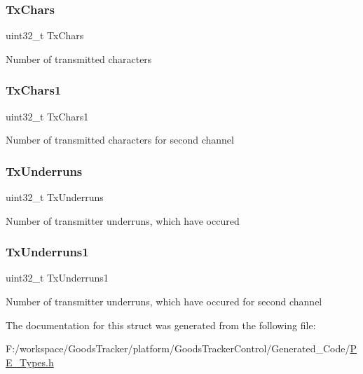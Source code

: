 \subsubsection{\texorpdfstring{Tx\+Chars}{TxChars}}
{\footnotesize\ttfamily uint32\+\_\+t Tx\+Chars}

Number of transmitted characters \mbox{\label{struct_l_d_d___s_s_i___t_stats_aaf7923b544b9bd5dfaeda106f17d0252}} 
\subsubsection{\texorpdfstring{Tx\+Chars1}{TxChars1}}
{\footnotesize\ttfamily uint32\+\_\+t Tx\+Chars1}

Number of transmitted characters for second channel \mbox{\label{struct_l_d_d___s_s_i___t_stats_a9bb1db011f85a3c7644080f7cc482925}} 
\subsubsection{\texorpdfstring{Tx\+Underruns}{TxUnderruns}}
{\footnotesize\ttfamily uint32\+\_\+t Tx\+Underruns}

Number of transmitter underruns, which have occured \mbox{\label{struct_l_d_d___s_s_i___t_stats_afa2358845fe19441eb484e0def37b928}} 
\subsubsection{\texorpdfstring{Tx\+Underruns1}{TxUnderruns1}}
{\footnotesize\ttfamily uint32\+\_\+t Tx\+Underruns1}

Number of transmitter underruns, which have occured for second channel 

The documentation for this struct was generated from the following file\+:\begin{DoxyCompactItemize}
\item 
F\+:/workspace/\+Goods\+Tracker/platform/\+Goods\+Tracker\+Control/\+Generated\+\_\+\+Code/\hyperlink{_p_e___types_8h}{P\+E\+\_\+\+Types.\+h}\end{DoxyCompactItemize}
